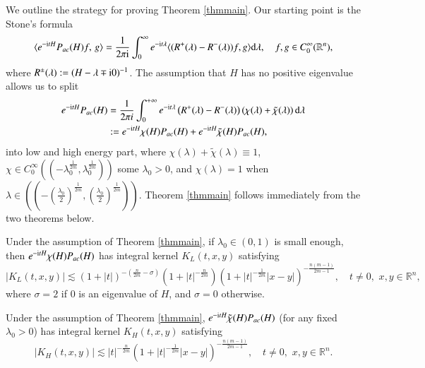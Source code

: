 \documentclass[11pt,reqno]{amsart}
\def\d{{\rm d}}
\def\i{{\rm i}}
\newtheorem{theorem}{Theorem}[section]
\numberwithin{equation}{section}
\theoremstyle{definition}
\begin{document}
We  outline the strategy for proving Theorem \ref{thmmain}.
Our starting point is the Stone's formula
\begin{equation}\label{equ0.2}
	\langle e^{-\i tH}P_{ac}(H)f,\, g\rangle=\frac{1}{2\pi \i}\int_0^{\infty}e^{-\i t\lambda}\langle(R^+(\lambda)-R^-(\lambda))f,g\rangle \d\lambda,\quad f, g\in C_0^{\infty}(\mathbb{R}^n),
\end{equation}
where $R^\pm(\lambda):=(H-\lambda\mp \i0)^{-1}$. The assumption that $H$ has no positive eigenvalue allows us to split
\begin{align*}
 e^{-\i tH}P_{ac}(H)&=\frac{1}{2\pi i} \int_{0}^{+\infty} e^{-\i  t \lambda}\left(R^{+}(\lambda)-R^{-}(\lambda)\right) (\chi(\lambda)+\tilde{\chi}(\lambda))\, \d \lambda\\
  & :=e^{-\i tH}\chi(H)P_{ac}(H)+e^{-\i tH}\tilde{\chi}(H)P_{ac}(H),
\end{align*}
into low and high energy part, where $\chi(\lambda)+\tilde{\chi}(\lambda)\equiv1$, $\chi\in C_0^\infty((-\lambda_0^\frac{1}{2m},\lambda_0^\frac{1}{2m}))$ some $\lambda_0>0$, and $\chi(\lambda)=1$ when $\lambda\in((-(\frac{\lambda_0}{2})^\frac{1}{2m},(\frac{\lambda_0}{2})^\frac{1}{2m}))$. Theorem \ref{thmmain} follows immediately from the two theorems below.
\begin{euclid}
	Under the assumption of Theorem \ref{thmmain}, if $\lambda_{0}\in (0, 1)$ is small enough, then  $e^{-\i tH}\chi(H)P_{ac}(H)$ has integral kernel  $K_{L}(t,x,y)$ satisfying
\begin{equation*}\label{equ4.1.2.0}
		\left|K_{L}(t, x, y)\right| \lesssim (1+|t|)^{-(\frac{n}{2m}-\sigma)}(1+|t|^{-\frac{n}{2 m}})\left(1+|t|^{-\frac{1}{2 m}}|x-y|\right)^{-\frac{n(m-1)}{2 m-1}},\quad t\neq0,\,\,x,y\in\mathbb{R}^n,
	\end{equation*}
where $\sigma=2$ if $0$ is an eigenvalue of $H$, and $\sigma=0$ otherwise.
\end{euclid}


\begin{euclid1}\label{theorem4.1}
	Under the assumption of Theorem \ref{thmmain}, $e^{-\i tH}\tilde{\chi}(H)P_{ac}(H)$ (for any fixed $\lambda_0>0$)  has integral kernel $K_{H}(t,x,y)$ satisfying
\begin{equation*}\label{equ4.1.2.11}
		\left|K_{H}(t, x, y)\right| \lesssim |t|^{-\frac{n}{2 m}}\left(1+|t|^{-\frac{1}{2 m}}|x-y|\right)^{-\frac{n(m-1)}{2 m-1}},\quad t\neq0,\,\,x,y\in\mathbb{R}^n.
	\end{equation*}
\end{euclid1}
\end{document}
